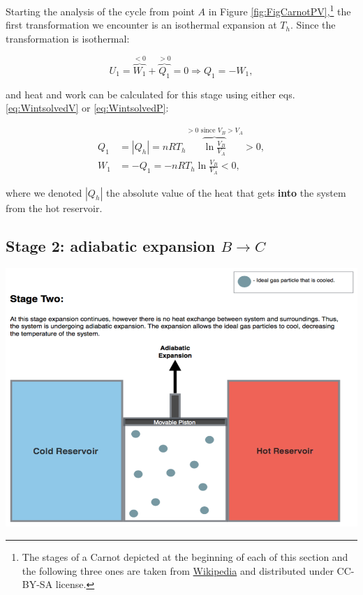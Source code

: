 \documentclass[
  9pt,
]{extbook}
\theoremstyle{definition}
\theoremstyle{definition}
\theoremstyle{definition}
\theoremstyle{remark}
\begin{document}
Starting the analysis of the cycle from point \(A\) in Figure \ref{fig:FigCarnotPV},\footnote{The stages of a Carnot depicted at the beginning of each of this section and the following three ones are taken from \href{https://en.wikipedia.org/wiki/Carnot_cycle}{Wikipedia} and distributed under CC-BY-SA license.} the first transformation we encounter is an isothermal expansion at \(T_h\). Since the transformation is isothermal:

\begin{equation}
U_1 = \overbrace{W_1}^{<0} + \overbrace{Q_1}^{>0} = 0 \Rightarrow Q_1 = -W_1,
  \label{eq:CCst1}
\end{equation}

and heat and work can be calculated for this stage using either eqs. \eqref{eq:WintsolvedV} or \eqref{eq:WintsolvedP}:

\begin{equation}
\begin{aligned}
 Q_1 & = \left| Q_h \right|  = nRT_h \overbrace{\ln \frac{V_B}{V_A}}^{>0 \text{ since } V_B>V_A} > 0, \\
 W_1 & = -Q_1 = - nRT_h \ln \frac{V_B}{V_A} < 0,
\end{aligned}
  \label{eq:CCst1b}
\end{equation}

where we denoted \(\left| Q_h \right|\) the absolute value of the heat that gets \textbf{into} the system from the hot reservoir.

\hypertarget{CCstage2}{%
\subsection{\texorpdfstring{Stage 2: adiabatic expansion \(B \rightarrow C\)}{Stage 2: adiabatic expansion B \textbackslash rightarrow C}}\label{CCstage2}}

\begin{center}\includegraphics[width=0.7\linewidth]{./img/OEP_Figures.007b} \end{center}
\end{document}
